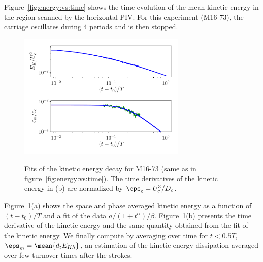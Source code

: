 Figure~\ref{fig:energy:vs:time} shows the time evolution of the mean kinetic
energy in the region scanned by the horizontal PIV. For this experiment
(M16-73), the carriage oscillates during 4 periods and is then stopped.

\begin{figure}[htp!]
\includegraphics[width=80mm]{tmp/fig_fit_EK}
\label{fig:fit:EK}

\caption{Fits of the kinetic energy decay for M16-73 (same as in
figure~\ref{fig:energy:vs:time}). The time derivatives of the kinetic energy in
(b) are normalized by $\eps_c = U_c^3 / D_c$.}

\end{figure}

Figure~\ref{fig:fit:EK}(a) shows the space and phase averaged kinetic energy as
a function of $(t - t_0)/T$ and a fit of the data $a / (1 + t^\alpha)/\beta$.
Figure~\ref{fig:fit:EK}(b) presents the time derivative of the kinetic energy
and the same quantity obtained from the fit of the kinetic energy. We finally
compute by averaging over time for $t < 0.5 T$, $\eps_m= \mean{d_t E_{Kh}}$, an
estimation of the kinetic energy dissipation averaged over few turnover times
after the strokes.

